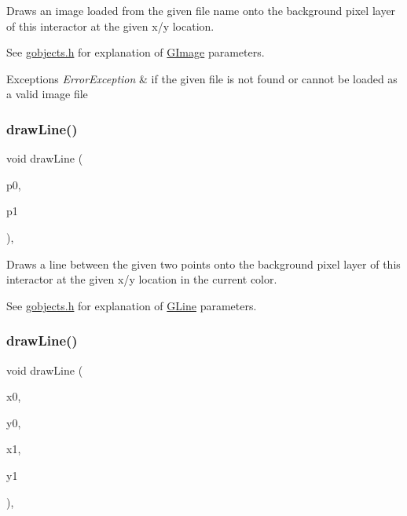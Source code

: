 Draws an image loaded from the given file name onto the background pixel layer of this interactor at the given x/y location. 

See \mbox{\hyperlink{gobjects_8h_source}{gobjects.\+h}} for explanation of \mbox{\hyperlink{classGImage}{G\+Image}} parameters. 
\begin{DoxyExceptions}{Exceptions}
{\em Error\+Exception} & if the given file is not found or cannot be loaded as a valid image file \\
\hline
\end{DoxyExceptions}
\mbox{\label{classGDrawingSurface_ae6a24b6b9a6e795d3165c1c750d5bdf1}} 
\subsubsection{\texorpdfstring{draw\+Line()}{drawLine()}\hspace{0.1cm}{\footnotesize\ttfamily [1/2]}}
{\footnotesize\ttfamily void draw\+Line (\begin{DoxyParamCaption}\item[{const \mbox{\hyperlink{structGPoint}{G\+Point}} \&}]{p0,  }\item[{const \mbox{\hyperlink{structGPoint}{G\+Point}} \&}]{p1 }\end{DoxyParamCaption})\hspace{0.3cm}{\ttfamily [virtual]}, {\ttfamily [inherited]}}



Draws a line between the given two points onto the background pixel layer of this interactor at the given x/y location in the current color. 

See \mbox{\hyperlink{gobjects_8h_source}{gobjects.\+h}} for explanation of \mbox{\hyperlink{classGLine}{G\+Line}} parameters. \mbox{\label{classGDrawingSurface_aff299fe83178d2f3ce8c08c06b583484}} 
\subsubsection{\texorpdfstring{draw\+Line()}{drawLine()}\hspace{0.1cm}{\footnotesize\ttfamily [2/2]}}
{\footnotesize\ttfamily void draw\+Line (\begin{DoxyParamCaption}\item[{double}]{x0,  }\item[{double}]{y0,  }\item[{double}]{x1,  }\item[{double}]{y1 }\end{DoxyParamCaption})\hspace{0.3cm}{\ttfamily [virtual]}, {\ttfamily [inherited]}}



